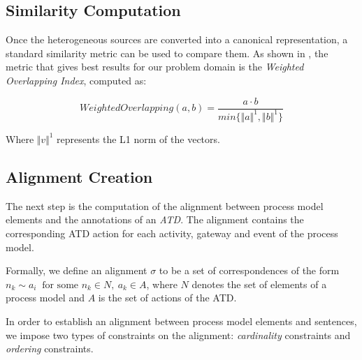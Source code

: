 \subsection{Similarity Computation}

Once the heterogeneous sources are converted into a canonical representation, a
standard similarity metric can be used to compare them. As shown in
\cite{10.1007/978-3-319-59536-8_26}, the metric that gives best results for our
problem domain is the \emph{Weighted Overlapping Index}, computed as:

\begin{equation}
  WeightedOverlapping(a, b) = \frac{a \cdot b}{min\{\Vert a \Vert^1, \Vert b \Vert^1\}}
\end{equation}

Where $\Vert v \Vert^1$ represents the L1 norm of the vectors.

\subsection{Alignment Creation}

The next step is the computation of the alignment between process model elements
and the annotations of an \emph{ATD}. The alignment contains the
corresponding ATD action for each activity, gateway and event of the process model.

\newcommand{\corresp}[2]{#1 \sim #2}
\newcommand{\ncorresp}[2]{#1 \nsim #2}

Formally, we define an alignment $\sigma$ to be a set of correspondences of the
form $\corresp{n_k}{a_i} ~ \text{ for some } n_k \in N, ~ a_k \in A$, where $N$
denotes the set of elements of a process model and  $A$ is the set of actions
of the ATD. 

In order to establish an alignment between process model elements and sentences,
we impose two types of constraints on the alignment:  \textit{cardinality}
constraints and \textit{ordering} constraints.

